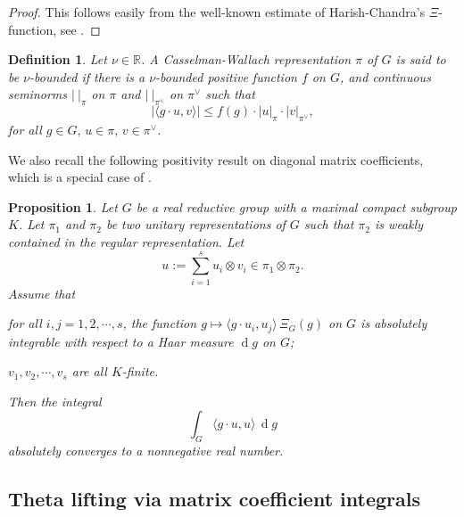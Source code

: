 \documentclass[12pt,a4paper]{amsart}
\def\abs#1{\left|{#1}\right|}
\newcommand{\od}{\operatorname{d}}
\newcommand{\R}{\mathbb R}
\newcommand{\la}{\langle}
\newcommand{\ra}{\rangle}
\numberwithin{equation}{section}
\newtheorem{lem}[thm]{Lemma}
\newtheorem{prpl}[thm]{Proposition}
\newtheorem{dfnl}[thm]{Definition}
\theoremstyle{remark}
\def\abfV{\bfV'}
\begin{document}
\begin{proof}
  This follows easily from the well-known estimate of Harish-Chandra's
  $\Xi$-function, see \cite[Theorem 4.5.3]{Wa1}.
\end{proof}

\begin{dfnl}
  Let $\nu\in \R$. A Casselman-Wallach representation $\pi$ of $G$ is said to be
  \emph{$\nu$-bounded} if there is a $\nu$-bounded positive function $f$ on $G$,
  and continuous seminorms $\abs{\ }_\pi$ on $\pi$ and $\abs{\ }_{\pi^\vee}$ on
  $\pi^\vee$ such that
  \[
    \abs{\la g\cdot u,v\ra}\leq f(g) \cdot \abs{u}_\pi \cdot \abs{v}_{\pi^\vee},
  \]
  for all $g\in G, \, u\in \pi, \, v\in \pi^\vee$.
\end{dfnl}


We also recall the following positivity result on diagonal matrix coefficients, which is a special case of \cite[Theorem A. 5]{HLS}.

\begin{prpl}\label{positivity}
Let $G$ be a real reductive group with a maximal compact subgroup $K$. Let $\pi_1$ and $\pi_2$ be two unitary representations of $G$ such that $\pi_2$ is weakly
contained in the regular representation.
Let
\[
u:=\sum_{i=1}^s u_i\otimes v_i\in \pi_1\otimes \pi_2.
\]
Assume that
\begin{enumC}
\item for all $i,j=1,2,\cdots, s$, the function
  $g\mapsto \la g \cdot u_i, u_j\ra\,\Xi_G (g)$ on $G$ is absolutely integrable with
  respect to a Haar measure $\od\! g$ on $G$;
\item
  $v_1,v_2,\cdots, v_s$ are all $K$-finite.
\end{enumC}
Then the integral
\[%
\int_G \la g\cdot u,u \rangle\,\od\! g
\]%
absolutely converges to a nonnegative real number.
\end{prpl}

\subsection{Theta lifting via matrix coefficient integrals}\label{sec:MCI}
\end{document}
